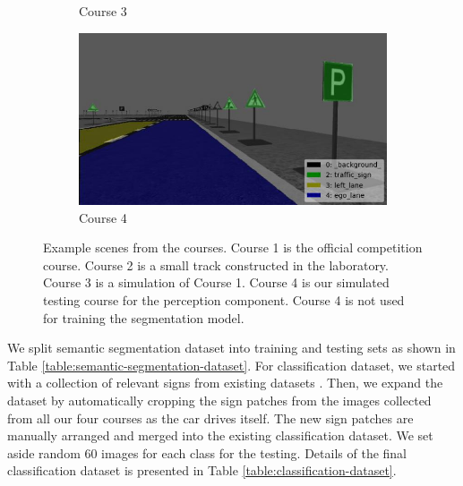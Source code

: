\begin{figure}[h]
\begin{subfigure}[b]{0.4\linewidth}
    \caption{Course 3}
  \end{subfigure}
  \begin{subfigure}[b]{0.4\linewidth}
      \includegraphics[width=\linewidth]{figures/course4.jpg}
    \caption{Course 4}
  \end{subfigure}
\caption{Example scenes from the courses. Course 1 is the official competition
    course. Course 2 is a small track constructed in the laboratory. Course 3
    is a simulation of Course 1. Course 4 is our simulated testing course for
    the perception component. Course 4 is not used for training the
    segmentation model.}
    \label{figure:annotated-courses}
\end{figure}

We split semantic segmentation dataset into training and testing sets as shown
in Table \ref{table:semantic-segmentation-dataset}. For classification dataset,
we started with a collection of relevant signs from existing datasets
\cite{cite11, cite12}.  Then, we expand the dataset by automatically cropping
the sign patches from the images collected from all our four courses as the car
drives itself. The new sign patches are manually arranged and merged into the
existing classification dataset. We set aside random 60 images for each class
for the testing. Details of the final classification dataset is presented in
Table \ref{table:classification-dataset}.

\begin{table}[h]
\caption{Traffic scene semantic segmentation dataset.}
\label{table:semantic-segmentation-dataset}
\end{table}

